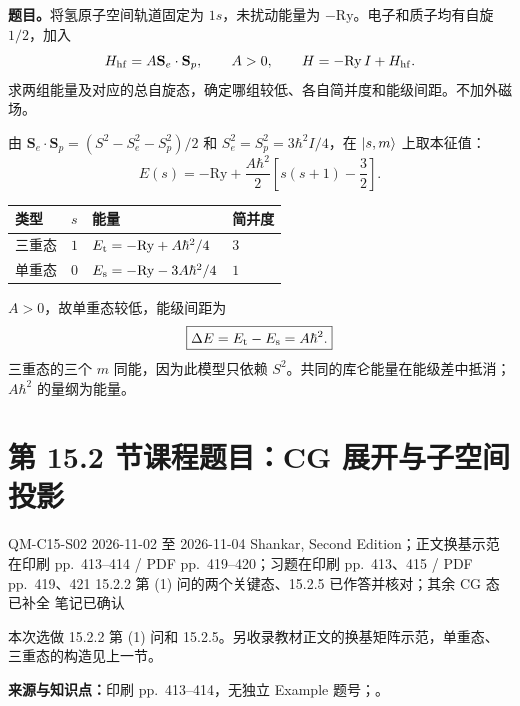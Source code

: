 \textbf{题目。}将氢原子空间轨道固定为 $1s$，未扰动能量为 $-\mathrm{Ry}$。电子和质子均有自旋 $1/2$，加入
\begin{equation}
  H_{\rm hf}=A\mathbf S_e\cdot\mathbf S_p,\qquad A>0,
  \qquad H=-\mathrm{Ry}\,I+H_{\rm hf}.
\end{equation}
求两组能量及对应的总自旋态，确定哪组较低、各自简并度和能级间距。不加外磁场。

\begin{checkedsolution}
由 $\mathbf S_e\cdot\mathbf S_p=(S^2-S_e^2-S_p^2)/2$ 和 $S_e^2=S_p^2=3\hbar^2I/4$，在 $\left|s,m\right\rangle$ 上取本征值：
\begin{equation}
  E(s)=-\mathrm{Ry}+\frac{A\hbar^2}{2}
    \left[s(s+1)-\frac32\right].
\end{equation}
\begin{center}
\begin{tabular}{@{}llll@{}}
  \toprule
  类型 & $s$ & 能量 & 简并度 \\
  \midrule
  三重态 & $1$ & $E_{\rm t}=-\mathrm{Ry}+A\hbar^2/4$ & $3$ \\
  单重态 & $0$ & $E_{\rm s}=-\mathrm{Ry}-3A\hbar^2/4$ & $1$ \\
  \bottomrule
\end{tabular}
\end{center}
$A>0$，故单重态较低，能级间距为
\begin{equation}
  \boxed{\Delta E=E_{\rm t}-E_{\rm s}=A\hbar^2.}
\end{equation}
三重态的三个 $m$ 同能，因为此模型只依赖 $S^2$。共同的库仑能量在能级差中抵消；$A\hbar^2$ 的量纲为能量。
\end{checkedsolution}

\section{第 15.2 节课程题目：CG 展开与子空间投影}
\label{exercises:QM-C15-S02}
\exercisemeta
  {QM-C15-S02}
  {2026-11-02 至 2026-11-04}
  {Shankar, Second Edition；正文换基示范在印刷 pp.~413--414 / PDF pp.~419--420；习题在印刷 pp.~413、415 / PDF pp.~419、421}
  {15.2.2 第 (1) 问的两个关键态、15.2.5 已作答并核对；其余 CG 态已补全}
  {笔记已确认}

本次选做 15.2.2 第 (1) 问和 15.2.5。另收录教材正文的换基矩阵示范，单重态、三重态的构造见上一节。

\textbf{来源与知识点：}印刷 pp.~413--414，无独立 Example 题号；。


